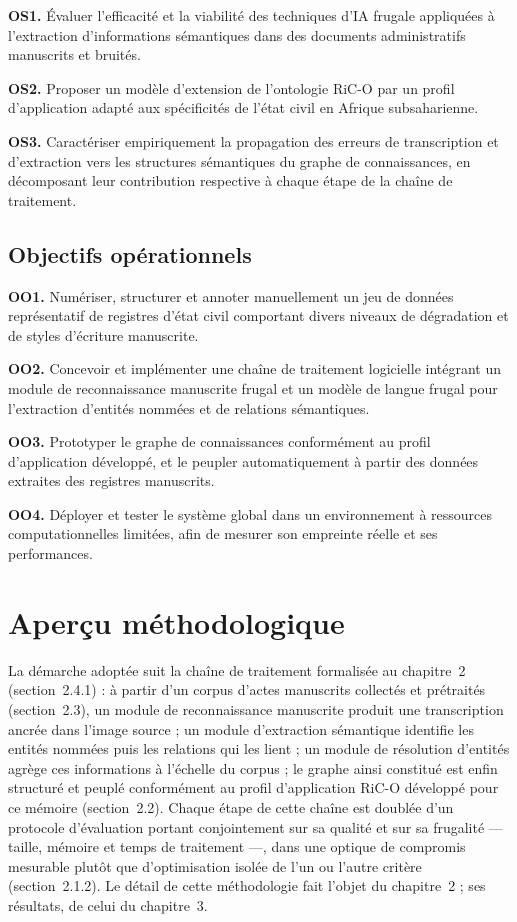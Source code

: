 \textbf{OS1.} Évaluer l'efficacité et la viabilité des techniques d'IA frugale appliquées à l'extraction d'informations sémantiques dans des documents administratifs manuscrits et bruités.

\textbf{OS2.} Proposer un modèle d'extension de l'ontologie RiC-O par un profil d'application adapté aux spécificités de l'état civil en Afrique subsaharienne.

\textbf{OS3.} Caractériser empiriquement la propagation des erreurs de transcription et d'extraction vers les structures sémantiques du graphe de connaissances, en décomposant leur contribution respective à chaque étape de la chaîne de traitement.

\subsection*{Objectifs opérationnels}

\textbf{OO1.} Numériser, structurer et annoter manuellement un jeu de données représentatif de registres d'état civil comportant divers niveaux de dégradation et de styles d'écriture manuscrite.

\textbf{OO2.} Concevoir et implémenter une chaîne de traitement logicielle intégrant un module de reconnaissance manuscrite frugal et un modèle de langue frugal pour l'extraction d'entités nommées et de relations sémantiques.

\textbf{OO3.} Prototyper le graphe de connaissances conformément au profil d'application développé, et le peupler automatiquement à partir des données extraites des registres manuscrits.

\textbf{OO4.} Déployer et tester le système global dans un environnement à ressources computationnelles limitées, afin de mesurer son empreinte réelle et ses performances.

\section*{Aperçu méthodologique}

La démarche adoptée suit la chaîne de traitement formalisée au chapitre~2 (section~2.4.1) : à partir d'un corpus d'actes manuscrits collectés et prétraités (section~2.3), un module de reconnaissance manuscrite produit une transcription ancrée dans l'image source ; un module d'extraction sémantique identifie les entités nommées puis les relations qui les lient ; un module de résolution d'entités agrège ces informations à l'échelle du corpus ; le graphe ainsi constitué est enfin structuré et peuplé conformément au profil d'application RiC-O développé pour ce mémoire (section~2.2).
Chaque étape de cette chaîne est doublée d'un protocole d'évaluation portant conjointement sur sa qualité et sur sa frugalité --- taille, mémoire et temps de traitement ---, dans une optique de compromis mesurable plutôt que d'optimisation isolée de l'un ou l'autre critère (section~2.1.2).
Le détail de cette méthodologie fait l'objet du chapitre~2 ; ses résultats, de celui du chapitre~3.

